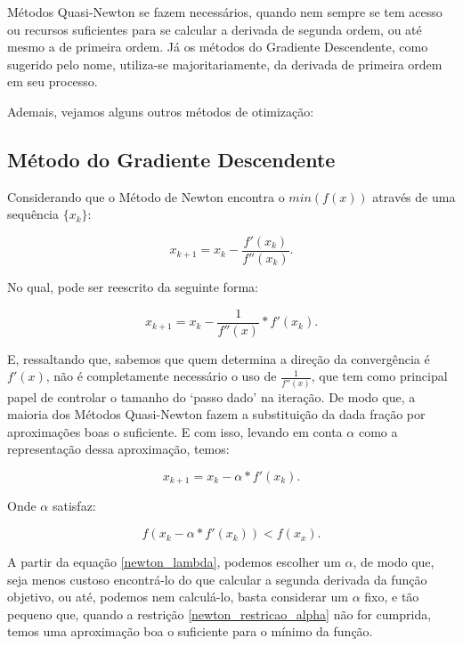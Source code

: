 Métodos Quasi-Newton se fazem necessários, quando nem sempre se tem acesso ou
recursos suficientes para se calcular a derivada de segunda ordem, ou até mesmo
a de primeira ordem. Já os métodos do Gradiente Descendente, como sugerido pelo
nome, utiliza-se majoritariamente, da derivada de primeira ordem em seu
processo.

Ademais, vejamos alguns outros métodos de otimização:

\subsection{Método do Gradiente Descendente}

Considerando que o Método de Newton encontra o \(min(f(x))\) através de uma
sequência \(\{x_k\}\):

\begin{equation}
    x_{k+1} = x_{k} - \frac {f'(x_{k})}{f''(x_{k})}.
\end{equation}

No qual, pode ser reescrito da seguinte forma:

\begin{equation}
    x_{k+1} = x_{k} -  \frac{1}{f''(x)} * f'(x_{k}).
\end{equation}

E, ressaltando que, sabemos que quem determina a direção da convergência é
\(f'(x)\), não é completamente necessário o uso de \( \frac{1}{f''(x)} \), que
tem como principal papel de controlar o tamanho do `passo dado' na iteração.
De modo que, a maioria dos Métodos Quasi-Newton fazem a substituição
da dada fração por aproximações boas o suficiente. E com isso, levando em
conta $\alpha$ como a representação dessa aproximação, temos:

\begin{equation}
    x_{k+1} = x_{k} -  \alpha * f'(x_{k}).
    \label{newton_lambda}
\end{equation}

Onde \(\alpha\) satisfaz:

\begin{equation}
    f(x_{k} -  \alpha * f'(x_{k})) < f(x_{x}).
    \label{newton_restricao_alpha}
\end{equation}

A partir da equação \ref{newton_lambda}, podemos escolher um \(\alpha\), de
modo que, seja menos custoso encontrá-lo do que calcular a segunda derivada
da função objetivo, ou até, podemos nem calculá-lo, basta considerar
um \(\alpha\) fixo, e tão pequeno que, quando a restrição
\ref{newton_restricao_alpha} não for cumprida, temos uma aproximação boa o
suficiente para o mínimo da função.

